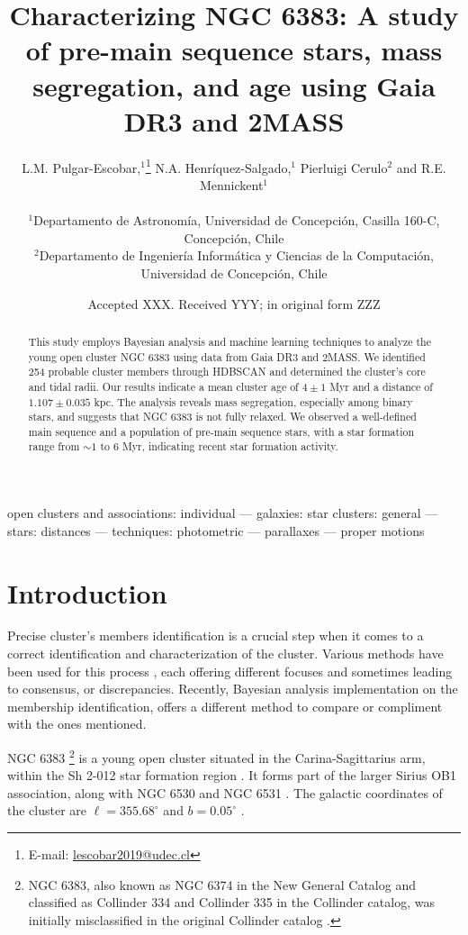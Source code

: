 \documentclass[fleqn,usenatbib,usedcolumn,useAMS]{mnras}
\title[Bayesian characterization of NGC 6383]{Characterizing NGC 6383: A study of pre-main sequence stars, mass segregation, and age using Gaia DR3 and 2MASS}
\author[Pulgar-Escobar et al.]{L.M. Pulgar-Escobar\orcidlink{0009-0008-4359-2444},$^{1}$\thanks{E-mail: \href{mailto:lescobar2019@udec.cl}{lescobar2019@udec.cl}} 
	N.A. Henríquez-Salgado,$^{1}$ Pierluigi Cerulo$^{2}$ and R.E. Mennickent$^{1}$
	\\
	\\
	$^{1}$Departamento de Astronomía, Universidad de Concepción, Casilla 160-C, Concepción, Chile \\
	$^{2}$Departamento de Ingeniería Informática y Ciencias de la Computación, Universidad de Concepción, Chile
}
\date{Accepted XXX. Received YYY; in original form ZZZ}
\begin{document}
	\label{firstpage}
	\pagerange{\pageref{firstpage}--\pageref{lastpage}}
	\maketitle
	
\begin{abstract}
	This study employs Bayesian analysis and machine learning techniques to analyze the young open cluster NGC 6383 using data from Gaia DR3 and 2MASS. We identified 254 probable cluster members through HDBSCAN and determined the cluster's core and tidal radii. Our results indicate a mean cluster age of $4 \pm 1$ Myr and a distance of $1.107 \pm 0.035$ kpc. The analysis reveals mass segregation, especially among binary stars, and suggests that NGC 6383 is not fully relaxed. We observed a well-defined main sequence and a population of pre-main sequence stars, with a star formation range from $\sim 1$ to $6$ Myr, indicating recent star formation activity.
\end{abstract}

	\begin{keywords}
		open clusters and associations: individual — galaxies: star clusters: general — stars: distances — techniques: photometric — parallaxes — proper motions
	\end{keywords}
	
\section{Introduction}\label{S_intro}
Precise cluster’s members identification is a crucial step when it comes to a correct identification and characterization of the cluster. Various methods have been used for this process  \citep{1930LicOB..14..154T, 1949ApJ...110..117S, 2018AA...610A..30A, 1978MNRAS.182..607F, 1989MNRAS.236..263P, 1991MNRAS.249...76B, 2005AA...438.1163K, 2007AA...462..157P, 1968ArA.....5....1L}, each offering different focuses and sometimes leading to consensus, or discrepancies. Recently, Bayesian analysis implementation on the membership identification, offers a different method to compare or compliment with the ones mentioned.

NGC 6383 \footnote{NGC 6383, also known as NGC 6374 in the New General Catalog \citep{2008hsf2.book..497R} and classified as Collinder 334 and Collinder 335 in the Collinder catalog, was initially misclassified in the original Collinder catalog \citep{1931AnLun...2....1C}.} is a young open cluster situated in the Carina-Sagittarius arm, within the Sh 2-012 star formation region \citep{1959ApJS....4..257S}. It forms part of the larger Sirius OB1 association, along with NGC 6530 and NGC 6531 \citep{2008hsf2.book..497R}. The galactic coordinates of the cluster are $\ell = 355.68^{\circ}$ and $b = 0.05^{\circ}$ \citep{2017A&A...600A.106C}. 
\end{document}

